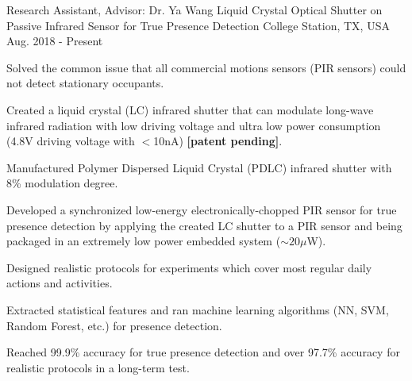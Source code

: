 

\begin{cventries}

  \cventry
    {Research Assistant, Advisor: Dr. Ya Wang} %
    {Liquid Crystal Optical Shutter on Passive Infrared Sensor for True Presence Detection} %
    {College Station, TX, USA} %
    {Aug. 2018 - Present} %
    {
      \begin{cvitems} %
        \item Solved the common issue that all commercial motions sensors (PIR sensors) could not detect stationary occupants.
        \item Created a liquid crystal (LC) infrared shutter that can modulate long-wave infrared radiation with low driving voltage and ultra low power consumption (4.8V driving voltage with $<$10nA) \textbf{[patent pending]}.
        \item Manufactured Polymer Dispersed Liquid Crystal (PDLC) infrared shutter with 8\% modulation degree.
        \item Developed a synchronized low-energy electronically-chopped PIR sensor for true presence detection by applying the created LC shutter to a PIR sensor and being packaged in an extremely low power embedded system ($\sim20\mu$W).
        \item Designed realistic protocols for experiments which cover most regular daily actions and activities. 
        \item Extracted statistical features and ran machine learning algorithms (NN, SVM, Random Forest, etc.) for presence detection.
        \item Reached 99.9\% accuracy for true presence detection and over 97.7\% accuracy for realistic protocols in a long-term test. 
      \end{cvitems}
    }


\end{cventries}
